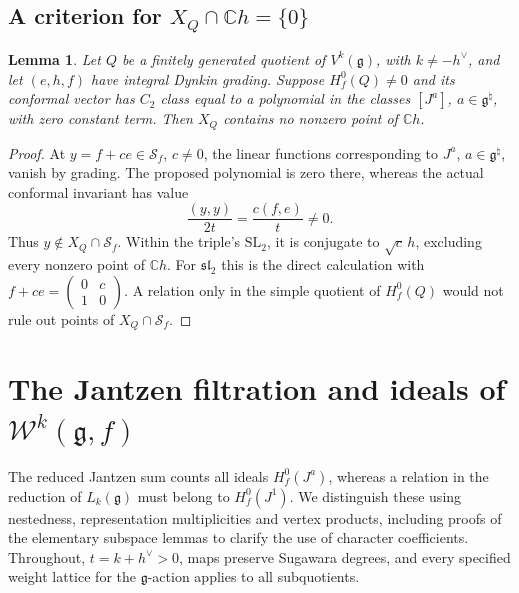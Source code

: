 \documentclass[11pt,a4paper]{amsart}
\numberwithin{equation}{section}
\newtheorem{lemma}[theorem]{Lemma}
\theoremstyle{definition}
\theoremstyle{remark}
\newcommand{\C}{\mathbb C}
\newcommand{\g}{\mathfrak g}
\newcommand{\slg}{\mathfrak{sl}}
\begin{document}
\subsection{A criterion for \texorpdfstring{$X_Q\cap\C h=\{0\}$}{XQ intersect C h = 0}}
\label{vtwo:affirmative-tools}
\begin{lemma}
\label{vtwo:sugawara-axis}
Let $Q$ be a finitely generated quotient of $V^k(\g)$, with $k\ne-h^\vee$, and let
$(e,h,f)$ have integral Dynkin grading. Suppose $H_f^0(Q)\ne0$ and its conformal vector has $C_2$ class equal to a polynomial
in the classes $[J^a]$, $a\in\g^\natural$, with zero constant term.
Then $X_Q$ contains no nonzero point of $\C h$.
\end{lemma}
\begin{proof}
At $y=f+ce\in\mathcal S_f$, $c\ne0$, the linear functions corresponding to $J^a$,
$a\in\g^\natural$, vanish by grading. The proposed polynomial is zero there,
whereas the actual conformal invariant has value
$$
 \frac{(y,y)}{2t}=\frac{c(f,e)}t\ne0.
$$
Thus $y\notin X_Q\cap\mathcal S_f$. Within the triple's
$\mathrm{SL}_2$, it is conjugate to $\sqrt c\,h$, excluding every
nonzero point of $\C h$. For $\slg_2$ this is the direct calculation with
$f+ce=\left(\begin{smallmatrix}0&c\\1&0\end{smallmatrix}\right)$.
A relation only in the simple quotient of $H_f^0(Q)$ would not rule out
points of $X_Q\cap\mathcal S_f$.
\end{proof}

\section{The Jantzen filtration and ideals of \texorpdfstring{$\mathcal W^k(\g,f)$}{Wk(g,f)}}\label{vtwo:actual-tools}
The reduced Jantzen sum counts all ideals $H_f^0(J^a)$, whereas a
relation in the reduction of $L_k(\g)$ must belong to $H_f^0(J^1)$.
We distinguish these using nestedness, representation multiplicities
and vertex products, including proofs of the elementary subspace
lemmas to clarify the use of character coefficients.
Throughout, $t=k+h^\vee>0$, maps preserve Sugawara degrees,
and every specified weight lattice for the $\g$-action applies to all
subquotients.
\end{document}
